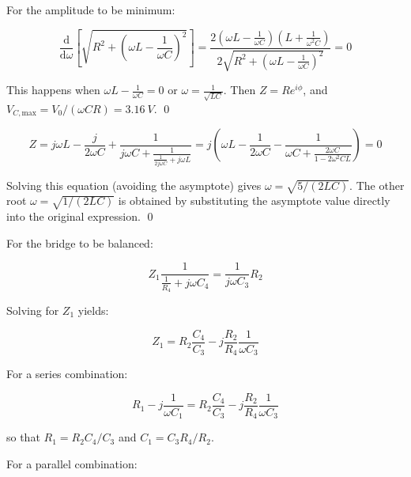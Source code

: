 \documentclass[12pt]{article}
\begin{document}
For the amplitude to be minimum:

\begin{equation}
    \frac{\mathrm{d}}{\mathrm{d}\omega} \left[ \sqrt{R^{2} + (\omega L - \frac{1}{\omega C})^{2}} \right] = \frac{2(\omega L - \frac{1}{\omega C})(L + \frac{1}{\omega^{2} C})}{2\sqrt{R^{2} + (\omega L - \frac{1}{\omega C})^{2}}} = 0
\end{equation}

This happens when $\omega L - \frac{1}{\omega C} = 0$ or $\omega = \frac{1}{\sqrt{LC}}$. Then $Z = R e^{i\phi}$, and $V_{C, \text{max}} = V_{0}/(\omega C R) = \qty{3.16}{V}$.
\qed



\begin{equation}
    Z = j \omega L - \frac{j}{2\omega C} + \frac{1}{j \omega C + \frac{1}{\frac{1}{2j \omega C} + j \omega L}} = j \left( \omega L - \frac{1}{2\omega C} - \frac{1}{\omega C + \frac{2\omega C}{1 - 2\omega^{2} C L}} \right) = 0
\end{equation}

Solving this equation (avoiding the asymptote) gives $\omega = \sqrt{5/(2LC)}$. The other root $\omega = \sqrt{1/(2LC)}$ is obtained by substituting the asymptote value directly into the original expression.
\qed



For the bridge to be balanced:

\begin{equation}
    Z_{1} \frac{1}{\frac{1}{R_{4}} + j \omega C_{4}} = \frac{1}{j \omega C_{3}} R_{2}
\end{equation}

Solving for $Z_{1}$ yields:

\begin{equation}
    Z_{1} = R_{2} \frac{C_{4}}{C_{3}} - j \frac{R_{2}}{R_{4}} \frac{1}{\omega C_{3}}
\end{equation}

For a series combination:

\begin{equation}
    R_{1} - j \frac{1}{\omega C_{1}} = R_{2} \frac{C_{4}}{C_{3}} - j \frac{R_{2}}{R_{4}} \frac{1}{\omega C_{3}}
\end{equation}

so that $R_{1} = R_{2} C_{4}/C_{3}$ and $C_{1} = C_{3} R_{4}/R_{2}$.

For a parallel combination:
\end{document}
